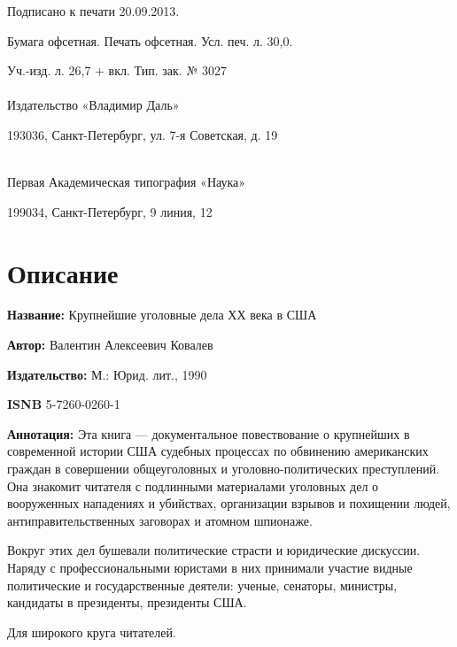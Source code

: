 \documentclass[12pt, a4paper, openany]{book}
\begin{document}
\begin{center}
{	Подписано к печати 20.09.2013.
	
	Бумага офсетная. Печать офсетная. Усл. печ. л. 30,0.
	
	Уч.-изд. л. 26,7 + вкл. Тип. зак. № 3027
		\ \\
				\ \\
		
Издательство «Владимир Даль»

193036, Санкт-Петербург, ул. 7-я Советская, д. 19
	
	\ \\
	
Первая Академическая типография «Наука»

199034, Санкт-Петербург, 9 линия, 12}


\end{center}
\thispagestyle{empty} %



\newpage

\setcounter{secnumdepth}{0}


\section*{Описание}

{\bf Название:} Крупнейшие уголовные дела ХХ века в США

{\bf Автор:} Валентин Алексеевич Ковалев

{\bf Издательство:} М.: Юрид. лит., 1990

{\bf ISNB} 5-7260-0260-1

{\bf Аннотация:} Эта книга — документальное повествование о крупнейших в  современной истории США судебных процессах по обвинению  американских граждан в совершении общеуголовных и уголовно-политических преступлений. Она знакомит читателя с подлинными материалами уголовных дел о вооруженных нападениях и убийствах, организации взрывов и похищении людей, антиправительственных заговорах и  атомном шпионаже. 

Вокруг этих дел бушевали политические страсти и юридические дискуссии. Наряду с профессиональными юристами в них принимали участие видные политические и государственные деятели: ученые, сенаторы, министры, кандидаты в президенты, президенты США. 

Для широкого круга читателей. 
\thispagestyle{empty} %


\newpage
\end{document}

